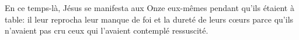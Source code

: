 En ce temps-là, Jésus se manifesta aux Onze eux-mêmes
	pendant qu’ils étaient à table:
	il leur reprocha leur manque de foi et la dureté de leurs cœurs
	parce qu’ils n’avaient pas cru ceux qui l’avaient contemplé ressuscité.

